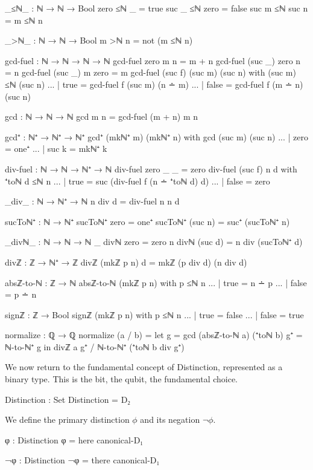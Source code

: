 \documentclass[11pt,a4paper]{book}
\begin{document}
\begin{code}
_≤ℕ_ : ℕ → ℕ → Bool
zero  ≤ℕ _     = true
suc _ ≤ℕ zero  = false
suc m ≤ℕ suc n = m ≤ℕ n

_>ℕ_ : ℕ → ℕ → Bool
m >ℕ n = not (m ≤ℕ n)

gcd-fuel : ℕ → ℕ → ℕ → ℕ
gcd-fuel zero    m n       = m + n
gcd-fuel (suc _) zero n    = n
gcd-fuel (suc _) m zero    = m
gcd-fuel (suc f) (suc m) (suc n) with (suc m) ≤ℕ (suc n)
... | true  = gcd-fuel f (suc m) (n ∸ m)
... | false = gcd-fuel f (m ∸ n) (suc n)

gcd : ℕ → ℕ → ℕ
gcd m n = gcd-fuel (m + n) m n

gcd⁺ : ℕ⁺ → ℕ⁺ → ℕ⁺
gcd⁺ (mkℕ⁺ m) (mkℕ⁺ n) with gcd (suc m) (suc n)
... | zero  = one⁺
... | suc k = mkℕ⁺ k


div-fuel : ℕ → ℕ → ℕ⁺ → ℕ
div-fuel zero    _       _ = zero
div-fuel (suc f) n d with ⁺toℕ d ≤ℕ n
... | true  = suc (div-fuel f (n ∸ ⁺toℕ d) d)
... | false = zero

_div_ : ℕ → ℕ⁺ → ℕ
n div d = div-fuel n n d

sucToℕ⁺ : ℕ → ℕ⁺
sucToℕ⁺ zero = one⁺
sucToℕ⁺ (suc n) = suc⁺ (sucToℕ⁺ n)


_divℕ_ : ℕ → ℕ → ℕ
_ divℕ zero = zero
n divℕ (suc d) = n div (sucToℕ⁺ d)

divℤ : ℤ → ℕ⁺ → ℤ
divℤ (mkℤ p n) d = mkℤ (p div d) (n div d)

absℤ-to-ℕ : ℤ → ℕ
absℤ-to-ℕ (mkℤ p n) with p ≤ℕ n
... | true  = n ∸ p
... | false = p ∸ n

signℤ : ℤ → Bool
signℤ (mkℤ p n) with p ≤ℕ n
... | true  = false
... | false = true

normalize : ℚ → ℚ
normalize (a / b) = 
  let g = gcd (absℤ-to-ℕ a) (⁺toℕ b)
      g⁺ = ℕ-to-ℕ⁺ g
  in divℤ a g⁺ / ℕ-to-ℕ⁺ (⁺toℕ b div g⁺)

\end{code}

We now return to the fundamental concept of Distinction, represented as a binary type. This is the bit, the qubit, the fundamental choice.

\begin{code}
Distinction : Set
Distinction = D₂
\end{code}

We define the primary distinction $\phi$ and its negation $\neg\phi$.

\begin{code}
φ : Distinction
φ = here canonical-D₁

¬φ : Distinction
¬φ = there canonical-D₁
\end{code}
\end{document}
